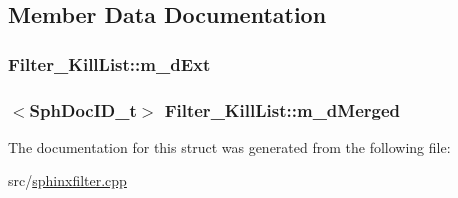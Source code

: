\subsection{Member Data Documentation}
\hypertarget{structFilter__KillList_ae2bb5f67fc6535dca0c88db07f28a2e3}{
\subsubsection[{m\-\_\-d\-Ext}]{ Filter\-\_\-\-Kill\-List\-::m\-\_\-d\-Ext}}\label{structFilter__KillList_ae2bb5f67fc6535dca0c88db07f28a2e3}
\hypertarget{structFilter__KillList_a94ee2630565ab56494bbbe33033bd59c}{
\subsubsection[{m\-\_\-d\-Merged}]{$<${\bf Sph\-Doc\-I\-D\-\_\-t}$>$ Filter\-\_\-\-Kill\-List\-::m\-\_\-d\-Merged}}\label{structFilter__KillList_a94ee2630565ab56494bbbe33033bd59c}


The documentation for this struct was generated from the following file\-:\begin{DoxyCompactItemize}
\item 
src/\hyperlink{sphinxfilter_8cpp}{sphinxfilter.\-cpp}\end{DoxyCompactItemize}

